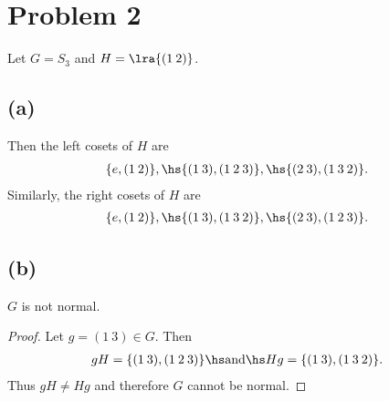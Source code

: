 \documentclass{article}
\begin{document}
\section*{Problem 2}

Let $G=S_3$ and $H=\lra{(1\: 2)}$.

\subsection*{(a)}

Then the left cosets of $H$ are
\begin{align*}
	\{e, (1\:2)\},\hs \{(1\:3), (1\:2\:3)\},\hs \{(2\:3), (1\:3\:2)\}.
\end{align*}
Similarly, the right cosets of $H$ are
\begin{align*}
	\{e, (1\:2)\},\hs \{(1\:3), (1\:3\:2)\},\hs \{(2\:3),(1\:2\:3)\}.
\end{align*}

\subsection*{(b)}

\begin{claim*}
	$G$ is not normal.
\end{claim*}

\begin{proof}
	Let $g=(1\:3)\in G$. Then
	\begin{align*}
		gH=\{(1\:3), (1\:2\:3)\}\hs\text{and}\hs Hg=\{(1\:3), (1\:3\:2)\}.
	\end{align*}
	Thus $gH\not=Hg$ and therefore $G$ cannot be normal.
\end{proof}
\end{document}
